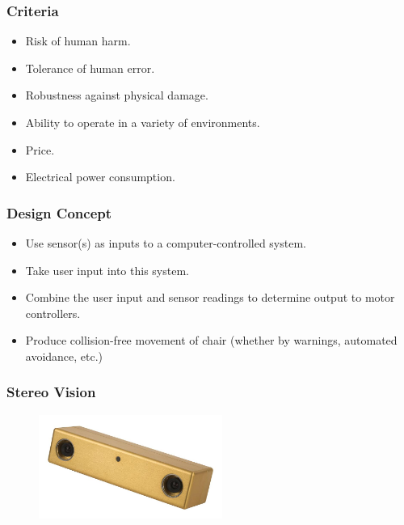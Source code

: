 \documentclass{beamer}
\begin{document}
\begin{frame}
  \frametitle{Criteria}
  \begin{itemize}
    \item Risk of human harm.\\
    \item Tolerance of human error.\\
    \item Robustness against physical damage.\\
    \item Ability to operate in a variety of environments. \\
    \item Price.\\
    \item Electrical power consumption.\\
  \end{itemize}
\end{frame}

\begin{frame}
  \frametitle{Design Concept}
  \begin{itemize}
    \item Use sensor(s) as inputs to a computer-controlled system. \\
    \item Take user input into this system. \\
    \item Combine the user input and sensor readings to determine output to motor controllers. \\
    \item Produce collision-free movement of chair (whether by warnings, automated avoidance, etc.) \\
  \end{itemize}
\end{frame}

\begin{frame}
  \frametitle{Stereo Vision}
  \begin{figure}
    \centering
    \includegraphics[width=6cm]{stereovision.jpg}
  \end{figure}
\end{frame}
\end{document}
